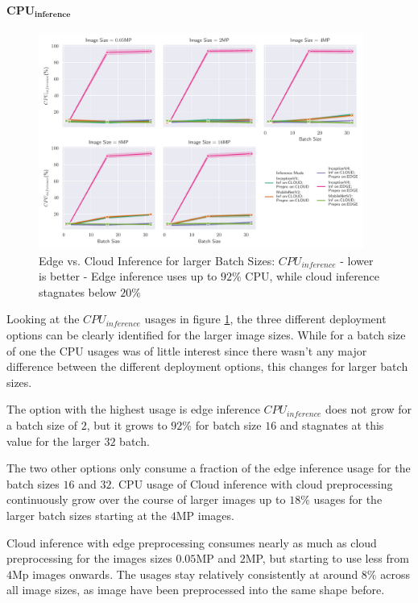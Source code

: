\paragraph{$\mathbf{CPU_{inference}}$}
\begin{figure}[!htb]
\centering
\includegraphics[width=0.95\textwidth]{./Bilder/single_plots/batch_size_plots/Effects_of_Batch_size_Inference_CPU_Usage.pdf}
\caption[Edge vs. Cloud Inference for larger Batch Sizes:  $CPU_{inference}$ - lower is better]{Edge vs. Cloud Inference for larger Batch Sizes:  $CPU_{inference}$ - lower is better - Edge inference uses up to $92\%$ CPU, while cloud inference stagnates below $20\%$}
\label{fig:BatchSizeInferenceCPU}
\end{figure}

Looking at the $CPU_{inference}$ usages in figure \ref{fig:BatchSizeInferenceCPU}, the three different deployment options can be clearly identified for the larger image sizes.
While for a batch size of one the CPU usages was of little interest since there wasn't any major difference between the different deployment options, this changes for larger batch sizes.

The option with the highest usage is edge inference $CPU_{inference}$ does not grow for a batch size of $2$, but it grows to $92\%$ for batch size $16$ and stagnates at this value for the larger $32$ batch.

The two other options only consume a fraction of the edge inference usage for the batch sizes $16$ and $32$.
CPU usage of Cloud inference with cloud preprocessing continuously grow over the course of larger images up to $18\%$ usages for the larger batch sizes starting at the $4$MP images.

Cloud inference with edge preprocessing consumes nearly as much as cloud preprocessing for the images sizes $0.05$MP and $2$MP, but starting to use less from $4$Mp images onwards.
The usages stay relatively consistently at around $8\%$ across all image sizes, as image have been preprocessed into the same shape before.

